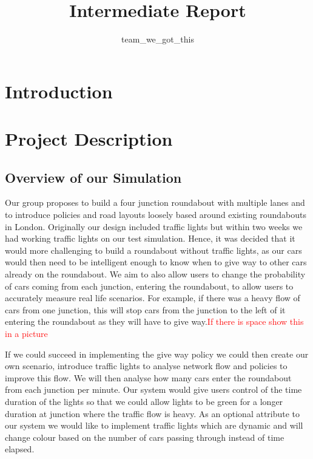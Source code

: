 \documentclass[11pt]{article}
\title{{Intermediate Report}}
\date{}
\author{team\_we\_got\_this}
\begin{document}
	\maketitle
	\thispagestyle{fancy}
	\section{Introduction}
	
	\section{Project Description}
	
	\subsection{Overview of our Simulation}
	
	Our group proposes to build a four junction roundabout with multiple lanes and to introduce policies and road layouts loosely based around existing roundabouts in London. Originally our design included traffic lights but within two weeks we had working traffic lights on our test simulation. Hence, it was decided that it would more challenging to build a roundabout without traffic lights, as our cars would then need to be intelligent enough to know when to give way to other cars already on the roundabout. We aim to also allow users to change the probability of cars coming from each junction, entering the roundabout, to allow users to accurately measure real life scenarios. For example, if there was a heavy flow of cars from one junction, this will stop cars from the junction to the left of it entering the roundabout as they will have to give way.\textcolor{red}{If there is space show this in a picture}
	
	If we could succeed in implementing the give way policy we could then create our own scenario, introduce
	traffic lights to analyse network flow and policies to improve this flow. We will then analyse how many cars enter the roundabout from each junction per minute. Our system would give users control of the time duration of the lights so that we could allow lights to be green for a longer duration at junction where the traffic flow is heavy. As an optional attribute to our system we would like to implement traffic lights which are dynamic and will change colour based on the number of cars passing through instead of time elapsed. \\
	
\end{document}
